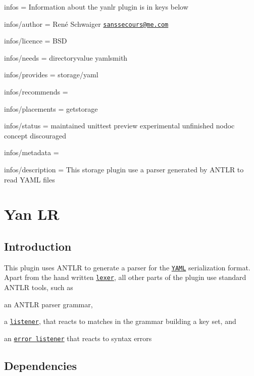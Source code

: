 
\begin{DoxyItemize}
\item infos = Information about the yanlr plugin is in keys below
\item infos/author = René Schwaiger \href{mailto:sanssecours@me.com}{\tt sanssecours@me.\+com}
\item infos/licence = B\+SD
\item infos/needs = directoryvalue yamlsmith
\item infos/provides = storage/yaml
\item infos/recommends =
\item infos/placements = getstorage
\item infos/status = maintained unittest preview experimental unfinished nodoc concept discouraged
\item infos/metadata =
\item infos/description = This storage plugin use a parser generated by A\+N\+T\+LR to read Y\+A\+ML files
\end{DoxyItemize}\hypertarget{md_src_plugins_yanlr_README_src_plugins_yanlr_README_md}{}\section{Yan LR}\label{md_src_plugins_yanlr_README_src_plugins_yanlr_README_md}
\subsection*{Introduction}

This plugin uses A\+N\+T\+LR to generate a parser for the \href{http://yaml.org}{\tt Y\+A\+ML} serialization format. Apart from the hand written \href{/home/markus/Projekte/Elektra/current/src/plugins/yanlr/yaml_lexer.cpp}{\tt lexer}, all other parts of the plugin use standard A\+N\+T\+LR tools, such as


\begin{DoxyItemize}
\item an A\+N\+T\+LR parser grammar,
\item a \href{/home/markus/Projekte/Elektra/current/src/plugins/yanlr/listener.cpp}{\tt listener}, that reacts to matches in the grammar building a key set, and
\item an \href{/home/markus/Projekte/Elektra/current/src/plugins/yanlr/error_listener.cpp}{\tt error listener} that reacts to syntax errors
\end{DoxyItemize}

\subsection*{Dependencies}

